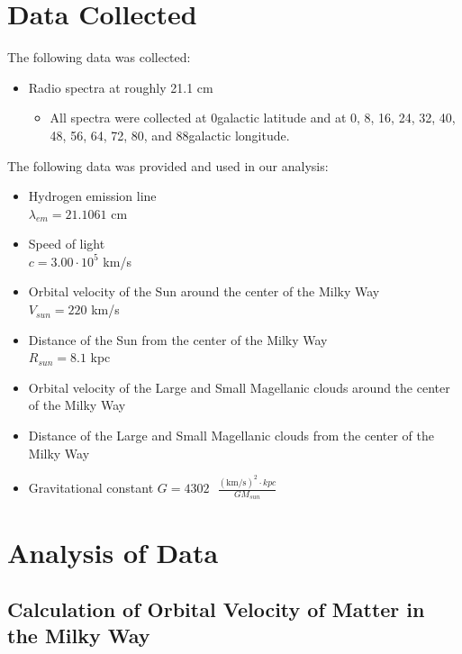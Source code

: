 \documentclass{article}
\begin{document}
\section{Data Collected}

\noindent The following data was collected:

\begin{itemize}
    \item Radio spectra at roughly 21.1 cm
    \begin{itemize}
        \item All spectra were collected at 0\degree \space galactic latitude and at 
        0\degree, 
        8\degree, 
        16\degree, 
        24\degree, 
        32\degree, 
        40\degree, 
        48\degree, 
        56\degree, 
        64\degree, 
        72\degree, 
        80\degree, and 
        88\degree galactic longitude.
    \end{itemize}
\end{itemize}

\noindent The following data was provided and used in our analysis:

\begin{itemize}
    \item Hydrogen emission line \\ $\lambda_{em}=21.1061$ cm
    \item Speed of light \\ $c=3.00\cdot10^5$ km/s
    \item Orbital velocity of the Sun around the center of the Milky Way \\ $V_{sun}=220$ km/s
    \item Distance of the Sun from the center of the Milky Way \\ $R_{sun}=8.1$ kpc
    \item Orbital velocity of the Large and Small Magellanic clouds around the center of the Milky Way
    \item Distance of the Large and Small Magellanic clouds from the center of the Milky Way
    \item Gravitational constant $G=4302\text{ }\frac{(\text{km/s})^2 \cdot kpc}{GM_{sun}}$
\end{itemize}

\section{Analysis of Data}

\subsection{Calculation of Orbital Velocity of Matter in the Milky Way}
\end{document}
